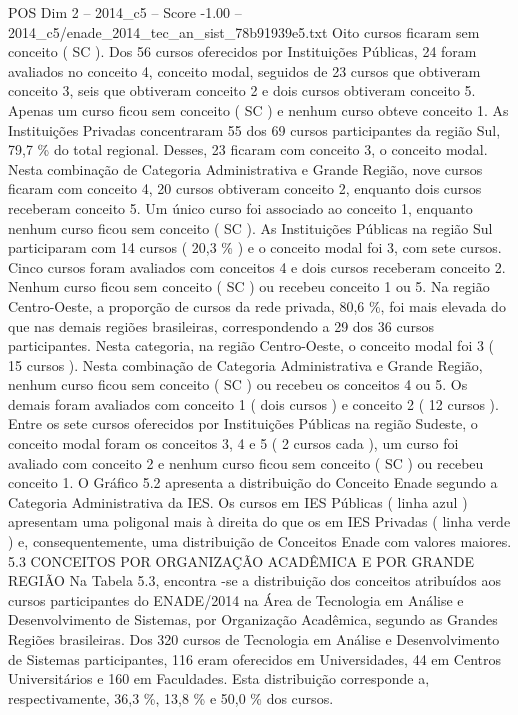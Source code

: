 \begin{textsample}{POS Dim 2 – 2014\_c5 – Score -1.00 – 2014\_c5/enade\_2014\_tec\_an\_sist\_78b91939e5.txt}
Oito cursos ficaram sem conceito ( SC ).
Dos 56 cursos oferecidos por Instituições Públicas, 24 foram avaliados no conceito 4, conceito modal, seguidos de 23 cursos que obtiveram conceito 3, seis que obtiveram conceito 2 e dois cursos obtiveram conceito 5.
Apenas um curso ficou sem conceito ( SC ) e nenhum curso obteve conceito 1.
As Instituições Privadas concentraram 55 dos 69 cursos participantes da região Sul, 79,7 \% do total regional.
Desses, 23 ficaram com conceito 3, o conceito modal.
Nesta combinação de Categoria Administrativa e Grande Região, nove cursos ficaram com conceito 4, 20 cursos obtiveram conceito 2, enquanto dois cursos receberam conceito 5.
Um único curso foi associado ao conceito 1, enquanto nenhum curso ficou sem conceito ( SC ).
As Instituições Públicas na região Sul participaram com 14 cursos ( 20,3 \% ) e o conceito modal foi 3, com sete cursos.
Cinco cursos foram avaliados com conceitos 4 e dois cursos receberam conceito 2.
Nenhum curso ficou sem conceito ( SC ) ou recebeu conceito 1 ou 5.
Na região Centro-Oeste, a proporção de cursos da rede privada, 80,6 \%, foi mais elevada do que nas demais regiões brasileiras, correspondendo a 29 dos 36 cursos participantes.
Nesta categoria, na região Centro-Oeste, o conceito modal foi 3 ( 15 cursos ).
Nesta combinação de Categoria Administrativa e Grande Região, nenhum curso ficou sem conceito ( SC ) ou recebeu os conceitos 4 ou 5.
Os demais foram avaliados com conceito 1 ( dois cursos ) e conceito 2 ( 12 cursos ).
Entre os sete cursos oferecidos por Instituições Públicas na região Sudeste, o conceito modal foram os conceitos 3, 4 e 5 ( 2 cursos cada ), um curso foi avaliado com conceito 2 e nenhum curso ficou sem conceito ( SC ) ou recebeu conceito 1.
O Gráfico 5.2 apresenta a distribuição do Conceito Enade segundo a Categoria Administrativa da IES.
Os cursos em IES Públicas ( linha azul ) apresentam uma poligonal mais à direita do que os em IES Privadas ( linha verde ) e, consequentemente, uma distribuição de Conceitos Enade com valores maiores. 5.3 CONCEITOS POR ORGANIZAÇÃO ACADÊMICA E POR GRANDE REGIÃO Na Tabela 5.3, encontra -se a distribuição dos conceitos atribuídos aos cursos participantes do ENADE/2014 na Área de Tecnologia em Análise e Desenvolvimento de Sistemas, por Organização Acadêmica, segundo as Grandes Regiões brasileiras.
Dos 320 cursos de Tecnologia em Análise e Desenvolvimento de Sistemas participantes, 116 eram oferecidos em Universidades, 44 em Centros Universitários e 160 em Faculdades.
Esta distribuição corresponde a, respectivamente, 36,3 \%, 13,8 \% e 50,0 \% dos cursos.

\end{textsample}
